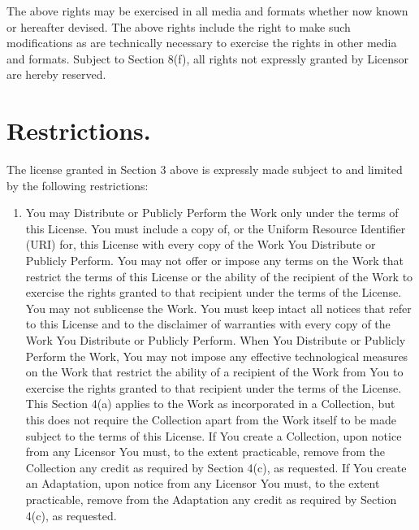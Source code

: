 \documentclass[10pt]{book}
\begin{document}
The above rights may be exercised in all media and         formats whether now known or hereafter devised. The above         rights include the right to make such modifications as are         technically necessary to exercise the rights in other media         and formats. Subject to Section 8(f), all rights not         expressly granted by Licensor are hereby reserved.

\section{ Restrictions.} The license granted in         Section 3 above is expressly made subject to and limited by         the following restrictions:
\begin{enumerate}
	\item You may Distribute or Publicly Perform the Work only           under the terms of this License. You must include a copy           of, or the Uniform Resource Identifier (URI) for, this           License with every copy of the Work You Distribute or           Publicly Perform. You may not offer or impose any terms           on the Work that restrict the terms of this License or           the ability of the recipient of the Work to exercise the           rights granted to that recipient under the terms of the           License. You may not sublicense the Work. You must keep           intact all notices that refer to this License and to the           disclaimer of warranties with every copy of the Work You           Distribute or Publicly Perform. When You Distribute or           Publicly Perform the Work, You may not impose any           effective technological measures on the Work that           restrict the ability of a recipient of the Work from You           to exercise the rights granted to that recipient under           the terms of the License. This Section 4(a) applies to           the Work as incorporated in a Collection, but this does           not require the Collection apart from the Work itself to           be made subject to the terms of this License. If You           create a Collection, upon notice from any Licensor You           must, to the extent practicable, remove from the           Collection any credit as required by Section 4(c), as           requested. If You create an Adaptation, upon notice from           any Licensor You must, to the extent practicable, remove           from the Adaptation any credit as required by Section           4(c), as requested.

\end{enumerate}
\end{document}
